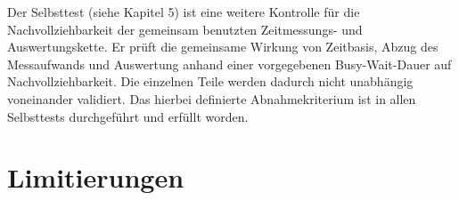 Der Selbsttest (siehe Kapitel 5) ist eine weitere Kontrolle f{\"u}r die Nachvollziehbarkeit der gemeinsam benutzten Zeitmessungs- und Auswertungskette. Er pr{\"u}ft die gemeinsame Wirkung von Zeitbasis, Abzug des Messaufwands und Auswertung anhand einer vorgegebenen Busy-Wait-Dauer auf Nachvollziehbarkeit. Die einzelnen Teile werden dadurch nicht unabh{\"a}ngig voneinander validiert. Das hierbei definierte Abnahmekriterium ist in allen Selbsttests durchgef{\"u}hrt und erf{\"u}llt worden.

\section{Limitierungen}
